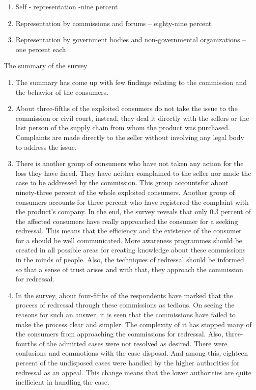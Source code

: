 \begin{multicols}{2}
\begin{enumerate}[label=$\bullet$]
\item Self - representation -nine percent

\item Representation by commissions and forums – eighty-nine percent

\item Representation by government bodies and non-governmental organizations – one percent each
\end{enumerate}

\noi
The summary of the survey

\begin{enumerate}[label=$\bullet$]
\item The summary has come up with few findings relating to the commission and the
behavior of the consumers.

\item About three-fifths of the exploited consumers do not take the issue to the commission
or civil court, instead, they deal it directly with the sellers or the last person of the
supply chain from whom the product was purchased. Complaints are made directly to
the seller without involving any legal body to address the issue.

\item There is another group of consumers who have not taken any action for the loss they
have faced. They have neither complained to the seller nor made the case to be
addressed by the commission. This group accountsfor about ninety-three percent of the
whole exploited consumers. Another group of consumers accounts for three percent
who have registered the complaint with the product’s company. In the end, the survey
reveals that only 0.3 percent of the affected consumers have really approached the
consumer for a seeking redressal. This means that the efficiency and the existence of
the consumer for a should be well communicated. More awareness programmes should be created in all possible areas for creating knowledge about these commissions in the
minds of people. Also, the techniques of redressal should be informed so that a sense
of trust arises and with that, they approach the commission for redressal.

\item In the survey, about four-fifths of the respondents have marked that the process of
redressal through these commissions as tedious. On seeing the reasons for such an
answer, it is seen that the commissions have failed to make the process clear and
simpler. The complexity of it has stopped many of the consumers from approaching the
commissions for redressal. Also, three-fourths of the admitted cases were not resolved
as desired. There were confusions and commotions with the case disposal. And among
this, eighteen percent of the undisposed cases were handled by the higher authorities
for redressal as an appeal. This change means that the lower authorities are quite
inefficient in handling the case.


\end{enumerate}
\end{multicols}
